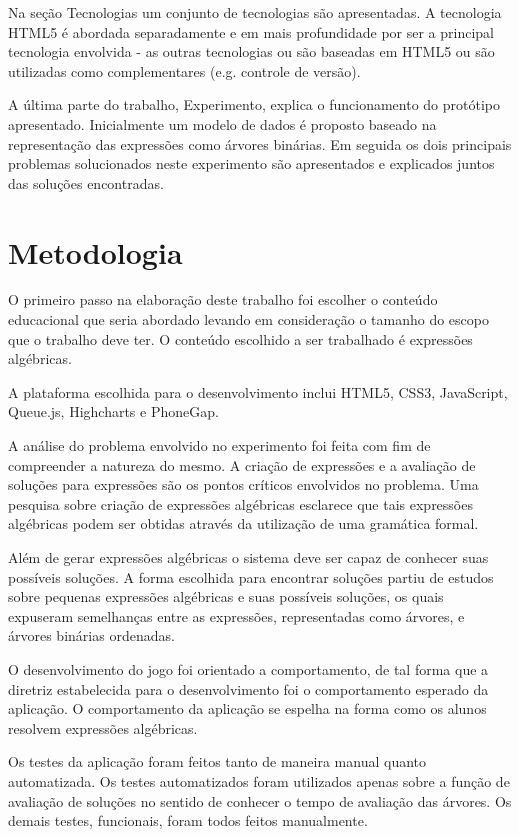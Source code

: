 Na seção Tecnologias um conjunto de tecnologias são apresentadas. A tecnologia HTML5 é abordada separadamente e em mais profundidade por ser a principal tecnologia envolvida - as outras tecnologias ou são baseadas em HTML5 ou são utilizadas como complementares (e.g. controle de versão).

A última parte do trabalho, Experimento, explica o funcionamento do protótipo apresentado. Inicialmente um modelo de dados é proposto baseado na representação das expressões como árvores binárias. Em seguida os dois principais problemas solucionados neste experimento são apresentados e explicados juntos das soluções encontradas.
		
\section{Metodologia}
O primeiro passo na elaboração deste trabalho foi escolher o conteúdo educacional que seria abordado levando em consideração o tamanho do escopo que o trabalho deve ter. O conteúdo escolhido a ser trabalhado é expressões algébricas.

	A plataforma escolhida para o desenvolvimento inclui HTML5, CSS3, JavaScript, Queue.js, Highcharts e PhoneGap.
	
	A análise do problema envolvido no experimento foi feita com fim de compreender a natureza do mesmo. A criação de expressões e a avaliação de soluções para expressões são os pontos críticos envolvidos no problema. Uma pesquisa sobre criação de expressões algébricas esclarece que tais expressões algébricas podem ser obtidas através da utilização de uma gramática formal.
	
	Além de gerar expressões algébricas o sistema deve ser capaz de conhecer suas possíveis soluções. A forma escolhida para encontrar soluções partiu de estudos sobre pequenas expressões algébricas e suas possíveis soluções, os quais expuseram semelhanças entre as expressões, representadas como árvores, e árvores binárias ordenadas.
	
	O desenvolvimento do jogo foi orientado a comportamento, de tal forma que a diretriz estabelecida para o desenvolvimento foi o comportamento esperado da aplicação. O comportamento da aplicação se espelha na forma como os alunos resolvem expressões algébricas.
	
	Os testes da aplicação foram feitos tanto de maneira manual quanto automatizada. Os testes automatizados foram utilizados apenas sobre a função de avaliação de soluções no sentido de conhecer o tempo de avaliação das árvores. Os demais testes, funcionais, foram todos feitos manualmente.
